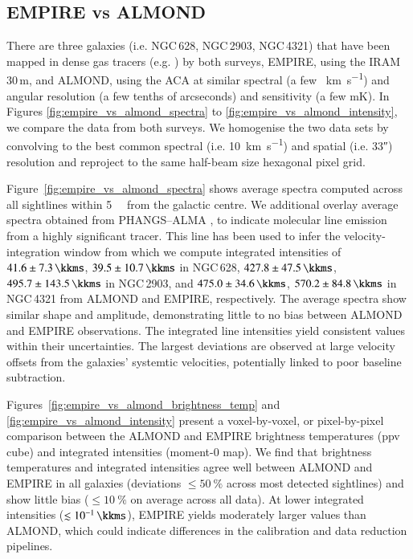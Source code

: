 \documentclass[letter, longauth]{aa} %
\begin{document}
\begin{appendix}

\section{EMPIRE vs ALMOND}
\label{sec:app:empire_vs_almond}

There are three galaxies (i.e. NGC\,628, NGC\,2903, NGC\,4321) that have been mapped in dense gas tracers (e.g. \hcnone) by both surveys, EMPIRE, using the IRAM 30\,m, and ALMOND, using the ACA at similar spectral (a few \SI{}{\km\per\second}) and angular resolution (a few tenths of arcseconds) and sensitivity (a few mK).
In Figures \ref{fig:empire_vs_almond_spectra} to \ref{fig:empire_vs_almond_intensity}, we compare 
the \hcnone data from both surveys.
We homogenise the two data sets by convolving to the best common spectral (i.e. \SI{10}{\km\per\s}) and spatial (i.e. \ang{;;33}) resolution and reproject to the same half-beam size hexagonal pixel grid.

Figure~\ref{fig:empire_vs_almond_spectra} shows average \hcnone spectra computed across all sightlines within \SI{5}{\kilo\parsec} from the galactic centre.
We additional overlay \cotwo average spectra obtained from PHANGS--ALMA \citep{Leroy2021b}, to indicate molecular line emission from a highly significant tracer.
This line has been used to infer the velocity-integration window from which we compute \hcnone integrated intensities of $41.6 \pm \SI{7.3}{\kkms}$, $39.5 \pm \SI{10.7}{\kkms}$ in NGC\,628, $427.8 \pm \SI{47.5}{\kkms}$, $495.7 \pm \SI{143.5}{\kkms}$ in NGC\,2903, and $475.0 \pm \SI{34.6}{\kkms}$, $570.2 \pm \SI{84.8}{\kkms}$ in NGC\,4321 from ALMOND and EMPIRE, respectively.
The average spectra show similar shape and amplitude, demonstrating little to no bias between ALMOND and EMPIRE observations.
The integrated line intensities yield consistent values within their uncertainties.
The largest deviations are observed at large velocity offsets from the galaxies' systemtic velocities, potentially linked to poor baseline subtraction.

Figures~\ref{fig:empire_vs_almond_brightness_temp} and \ref{fig:empire_vs_almond_intensity} present a voxel-by-voxel, or pixel-by-pixel comparison between the ALMOND and EMPIRE \hcnone brightness temperatures (ppv cube) and integrated intensities (moment-0 map).
We find that brightness temperatures and integrated intensities agree well between ALMOND and EMPIRE in all galaxies (deviations $\leq\SI{50}{\percent}$ across most detected sightlines) and show little bias ($\leq\SI{10}{\percent}$ on average across all data).
At lower integrated intensities ($\lesssim\SI{e-1}{\kkms}$), EMPIRE yields moderately larger values than ALMOND, which could indicate differences in the calibration and data reduction pipelines.


\end{appendix}
\end{document}
